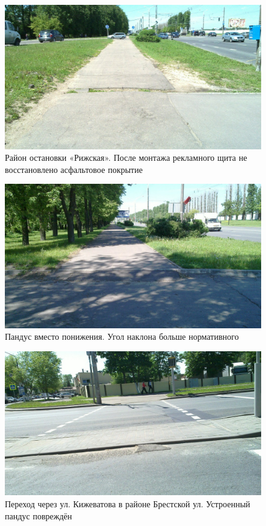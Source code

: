 \documentclass[a4paper,14pt,twoside]{extarticle}
\begin{document}
\begin{figure}[h!]
    \centering
    \includegraphics[width=\textwidth]{Pictures/1000000000000A00000005A0CF7F4A3C.jpg}
    \caption{Район остановки «Рижская». После монтажа рекламного щита не восстановлено асфальтовое покрытие}
\end{figure}

\begin{figure}[h!]
    \centering
    \includegraphics[width=\textwidth]{Pictures/1000000000000A00000005A003D7DB9F.jpg}
    \caption{Пандус вместо понижения. Угол наклона больше нормативного}
\end{figure}

\begin{figure}[h!]
    \centering
    \includegraphics[width=\textwidth]{Pictures/1000000000000A00000005A06669A335.jpg}
    \caption{Переход через ул. Кижеватова в районе Брестской ул. Устроенный пандус повреждён}
\end{figure}
\end{document}

